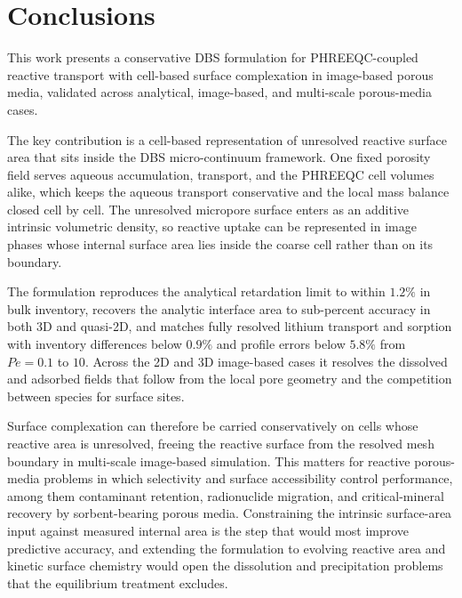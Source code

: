 \section{Conclusions}

This work presents a conservative DBS formulation for PHREEQC-coupled reactive
transport with cell-based surface complexation in image-based porous media,
validated across analytical, image-based, and multi-scale porous-media cases.

The key contribution is a cell-based representation of unresolved reactive
surface area that sits inside the DBS micro-continuum framework. One fixed
porosity field serves aqueous accumulation, transport, and the PHREEQC cell
volumes alike, which keeps the aqueous transport conservative and the local
mass balance closed cell by cell. The unresolved micropore surface enters as an
additive intrinsic volumetric density, so reactive uptake can be represented in
image phases whose internal surface area lies inside the coarse cell rather
than on its boundary.

The formulation reproduces the analytical retardation limit to within $1.2\%$
in bulk inventory, recovers the analytic interface area to sub-percent accuracy
in both 3D and quasi-2D, and matches fully resolved lithium transport and
sorption with inventory differences below $0.9\%$ and profile errors below
$5.8\%$ from $Pe = 0.1$ to $10$. Across the 2D and 3D image-based cases it
resolves the dissolved and adsorbed fields that follow from the local pore
geometry and the competition between species for surface sites.

Surface complexation can therefore be carried conservatively on cells whose
reactive area is unresolved, freeing the reactive surface from the resolved
mesh boundary in multi-scale image-based simulation. This matters for reactive
porous-media problems in which selectivity and surface accessibility control
performance, among them contaminant retention, radionuclide migration, and
critical-mineral recovery by sorbent-bearing porous media. Constraining the intrinsic surface-area input against measured internal area is
the step that would most improve predictive accuracy, and extending the
formulation to evolving reactive area and kinetic surface chemistry would open
the dissolution and precipitation problems that the equilibrium treatment
excludes.
